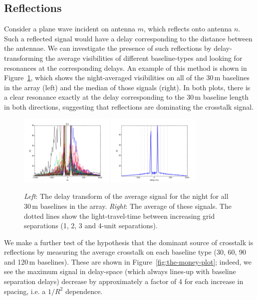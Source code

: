 \documentclass[10pt,a4paper,notitlepage]{article}
\begin{document}
\subsection{Reflections}
Consider a plane wave incident on antenna $m$, which reflects onto antenna $n$. Such a reflected signal would have a delay corresponding to the distance between the antennae. We can investigate the presence of such reflections by delay-transforming the average visibilities of different baseline-types and looking for resonances at the corresponding delays. An example of this method is shown in Figure~\ref{fig:xtalk-for-BL1}, which shows the night-averaged visibilities on all of the 30\,m baselines in the array (left) and the median of those signals (right). In both plots, there is a clear resonance exactly at the delay corresponding to the 30\,m baseline length in both directions, suggesting that reflections are dominating the crosstalk signal.\\

\begin{figure}
\centering
\includegraphics[width=0.4\textwidth]{6250_yy_xtalk_that_night_BLtype1_d.png}
\includegraphics[width=0.4\textwidth]{6250_yy_xtalk_that_night_BLtype1_median_d.png}
\caption{\textit{Left}: The delay transform of the average signal for the night for all 30\,m baselines in the array. \textit{Right}: The average of these signals. The dotted lines show the light-travel-time between increasing grid separations (1, 2, 3 and 4-unit separations).}
\label{fig:xtalk-for-BL1}
\end{figure}

We make a further test of the hypothesis that the dominant source of crosstalk is reflections by measuring the average crosstalk on each baseline type (30, 60, 90 and 120\,m baselines). These are shown in Figure~\ref{fig:the-money-plot}; indeed, we see the maximum signal in delay-space (which always lines-up with baseline separation delays) decrease by approximately a factor of 4 for each increase in spacing, i.e. a $1/R^2$ dependence.\\
\end{document}

